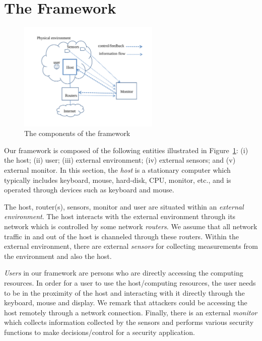 \section{The Framework}
\label{sec:sensor-framework}

\begin{figure}[htb]
\centering
\includegraphics[width=0.6\textwidth]{sensor/components}
\caption{The components of the framework} \label{fig:components}
\end{figure}

Our framework is composed of the following
entities illustrated in Figure~\ref{fig:components}:
(i) the host;
(ii) user;
(iii) external environment;
(iv) external sensors;
and (v) external monitor.
In this section, the {\em host} is a stationary computer which typically includes
keyboard, mouse, hard-disk, CPU, monitor, etc., and is operated through 
devices such as keyboard and mouse.

The host, router(s), sensors, monitor and user are situated within
an {\em external environment}.
The host interacts with the external environment through its network
which is controlled by some network {\em routers}.
We assume that all network traffic in and out of the host is
channeled through these routers.
Within the external environment, there are external {\em sensors} for
collecting measurements from the environment and also the host.

{\em Users} in our framework are persons who are
directly accessing the computing resources.
In order for a user to use the host/computing resources, the user
needs to be in the proximity of the host and interacting with it directly
through the keyboard, mouse and display.
We remark that attackers could be accessing the host remotely through
a network connection.
Finally, there is an external {\em monitor} which collects information
collected by the sensors and performs various security functions to
make decisions/control for a security application.

